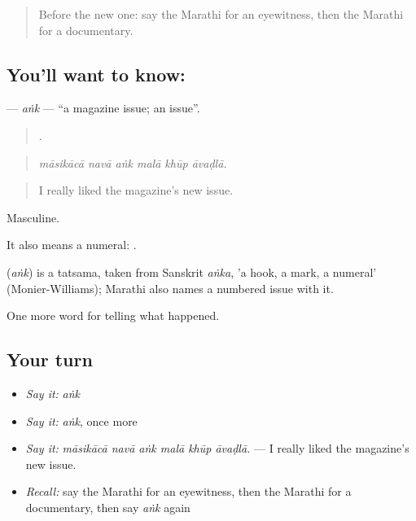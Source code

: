 \label{lesson:MR-C315-ank}



\begin{quote}
Before the new one: say the Marathi for an eyewitness, then the Marathi for a documentary.
\end{quote}

\subsection*{You'll want to know: }
\textbf{} — \emph{aṅk} — \textquotedblleft{}a magazine issue; an issue\textquotedblright{}.

\begin{quote}
     .
\end{quote}

\begin{quote}
\emph{māsikācā navā aṅk malā khūp āvaḍlā.}
\end{quote}

\begin{quote}
I really liked the magazine's new issue.
\end{quote}

Masculine.

It also means a numeral:   .

\begin{cousinweb}
\textbf{} (\emph{aṅk}) is a tatsama, taken from Sanskrit \emph{aṅka}, 'a hook, a mark, a numeral' (Monier-Williams); Marathi also names a numbered issue with it.
\end{cousinweb}

\begin{grammarlens}[title={What you've built}]
One more word for telling what happened.
\end{grammarlens}

\subsection*{Your turn}
\begin{itemize}
\raggedright
  \item \emph{Say it:} \emph{aṅk}
  \item \emph{Say it:} \emph{aṅk}, once more
  \item \emph{Say it:} \emph{māsikācā navā aṅk malā khūp āvaḍlā.} — I really liked the magazine's new issue.
  \item \emph{Recall:} say the Marathi for an eyewitness, then the Marathi for a documentary, then say \emph{aṅk} again
\end{itemize}

